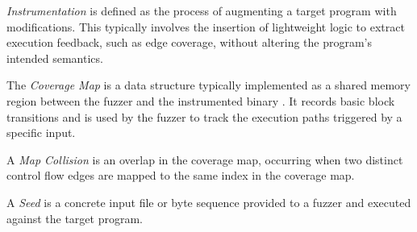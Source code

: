\begin{defin}[Instrumentation]
    \textit{Instrumentation} is defined as the process of augmenting a target program with modifications. This typically involves the insertion of lightweight logic to extract execution feedback, such as edge coverage, without altering the program's intended semantics.
\end{defin}

\begin{defin}
    The \textit{Coverage Map} is a data structure typically implemented as a shared memory region between the fuzzer and the instrumented binary \cite{zalewski2014afltech}. It records basic block transitions and is used by the fuzzer to track the execution paths triggered by a specific input.   
\end{defin}

\begin{defin}
    A \textit{Map Collision} is an overlap in the coverage map, occurring when two distinct control flow edges are mapped to the same index in the coverage map. 
\end{defin}

\begin{defin}[Seed]
    A \textit{Seed} is a concrete input file or byte sequence provided to a fuzzer and executed against the target program.
\end{defin}

